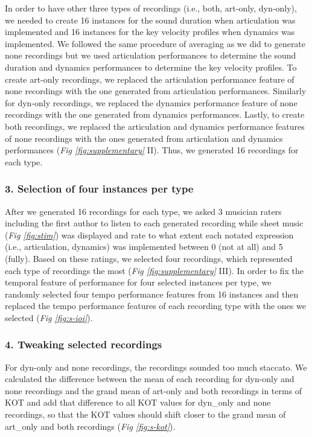 \documentclass[
  man,floatsintext]{apa6}
\begin{document}
In order to have other three types of recordings (i.e., both, art-only, dyn-only), we needed to create 16 instances for the sound duration when articulation was implemented and 16 instances for the key velocity profiles when dynamics was implemented. We followed the same procedure of averaging as we did to generate none recordings but we used articulation performances to determine the sound duration and dynamics performances to determine the key velocity profiles. To create art-only recordings, we replaced the articulation performance feature of none recordings with the one generated from articulation performances. Similarly for dyn-only recordings, we replaced the dynamics performance feature of none recordings with the one generated from dynamics performances. Lastly, to create both recordings, we replaced the articulation and dynamics performance features of none recordings with the ones generated from articulation and dynamics performances (\emph{Fig \ref{fig:supplementary}} II). Thus, we generated 16 recordings for each type.

\hypertarget{selection-of-four-instances-per-type}{%
\subsubsection{3. Selection of four instances per type}\label{selection-of-four-instances-per-type}}

After we generated 16 recordings for each type, we asked 3 musician raters including the first author to listen to each generated recording while sheet music (\emph{Fig \ref{fig:stim}}) was displayed and rate to what extent each notated expression (i.e., articulation, dynamics) was implemented between 0 (not at all) and 5 (fully). Based on these ratings, we selected four recordings, which represented each type of recordings the most (\emph{Fig \ref{fig:supplementary}} III). In order to fix the temporal feature of performance for four selected instances per type, we randomly selected four tempo performance features from 16 instances and then replaced the tempo performance features of each recording type with the ones we selected (\emph{Fig \ref{fig:s-ioi}}).

\hypertarget{tweaking-selected-recordings}{%
\subsubsection{4. Tweaking selected recordings}\label{tweaking-selected-recordings}}

For dyn-only and none recordings, the recordings sounded too much staccato. We calculated the difference between the mean of each recording for dyn-only and none recordings and the grand mean of art-only and both recordings in terms of KOT and add that difference to all KOT values for dyn\_only and none recordings, so that the KOT values should shift closer to the grand mean of art\_only and both recordings (\emph{Fig \ref{fig:s-kot}}).
\end{document}
